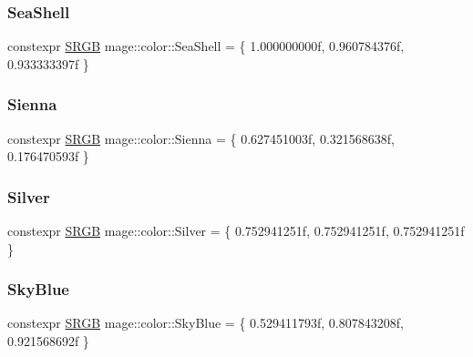 \hypertarget{namespacemage_1_1color_a5e4243f642decadd295b985c23e2d33c}{}\label{namespacemage_1_1color_a5e4243f642decadd295b985c23e2d33c} 
\subsubsection{\texorpdfstring{Sea\+Shell}{SeaShell}}
{\footnotesize\ttfamily constexpr \hyperlink{structmage_1_1_s_r_g_b}{S\+R\+GB} mage\+::color\+::\+Sea\+Shell = \{ 1.\+000000000f, 0.\+960784376f, 0.\+933333397f \}}

\hypertarget{namespacemage_1_1color_a805d6bfd5de14dc964ad41f06350edb1}{}\label{namespacemage_1_1color_a805d6bfd5de14dc964ad41f06350edb1} 
\subsubsection{\texorpdfstring{Sienna}{Sienna}}
{\footnotesize\ttfamily constexpr \hyperlink{structmage_1_1_s_r_g_b}{S\+R\+GB} mage\+::color\+::\+Sienna = \{ 0.\+627451003f, 0.\+321568638f, 0.\+176470593f \}}

\hypertarget{namespacemage_1_1color_aa07a6c3c5a18af608248962707b71a6f}{}\label{namespacemage_1_1color_aa07a6c3c5a18af608248962707b71a6f} 
\subsubsection{\texorpdfstring{Silver}{Silver}}
{\footnotesize\ttfamily constexpr \hyperlink{structmage_1_1_s_r_g_b}{S\+R\+GB} mage\+::color\+::\+Silver = \{ 0.\+752941251f, 0.\+752941251f, 0.\+752941251f \}}

\hypertarget{namespacemage_1_1color_a2a8dee46433148215b90b8c77fd4d209}{}\label{namespacemage_1_1color_a2a8dee46433148215b90b8c77fd4d209} 
\subsubsection{\texorpdfstring{Sky\+Blue}{SkyBlue}}
{\footnotesize\ttfamily constexpr \hyperlink{structmage_1_1_s_r_g_b}{S\+R\+GB} mage\+::color\+::\+Sky\+Blue = \{ 0.\+529411793f, 0.\+807843208f, 0.\+921568692f \}}


